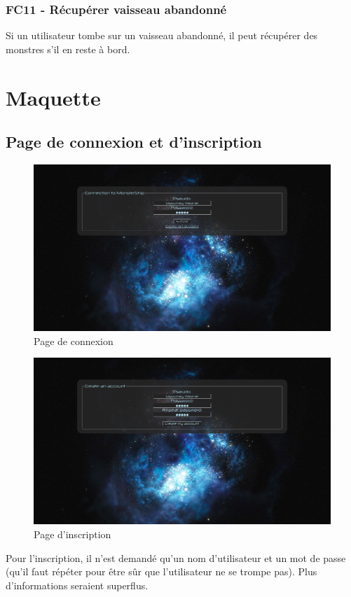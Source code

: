 \documentclass[a4paper,11pt]{report}
\begin{document}
        \subsection{FC11 - Récupérer vaisseau abandonné}
            Si un utilisateur tombe sur un vaisseau abandonné, il peut récupérer des monstres s'il en reste à bord.
    
\chapter{Maquette}
    \section{Page de connexion et d'inscription}
        \begin{figure}[H]
            \begin{center}
                \includegraphics[width=\textwidth]{maquette/screens/login.png}
                \caption{Page de connexion}
                \label{fig:connexion}
            \end{center}
        \end{figure}
        \begin{figure}[H]
            \begin{center}
                \includegraphics[width=\textwidth]{maquette/screens/registration.png}
                \caption{Page d'inscription}
                \label{fig:inscription}
            \end{center}
        \end{figure}
        Pour l'inscription, il n'est demandé qu'un nom d'utilisateur et un mot de passe (qu'il faut répéter pour être sûr que l'utilisateur ne se trompe pas). Plus d'informations seraient superflus.
\end{document}
